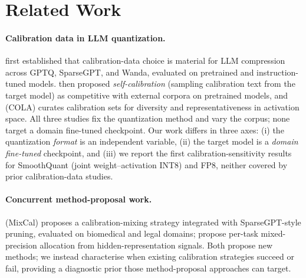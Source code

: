 \documentclass[11pt]{article}
\begin{document}
\section{Related Work}
\label{sec:related}

\paragraph{Calibration data in LLM quantization.}
\begin{sloppypar}
\citet{williams2024calibration} first established that
calibration-data choice is material for LLM compression across
GPTQ, SparseGPT, and Wanda, evaluated on pretrained and
instruction-tuned models.
\citet{williams2025selfcalib} then proposed \emph{self-calibration}
(sampling calibration text from the target model) as competitive
with external corpora on pretrained models, and
\citet{he2025cola} (COLA) curates calibration sets for diversity
and representativeness in activation space.  All three studies
fix the quantization method and vary the corpus; none target a
domain fine-tuned checkpoint.  Our
work differs in three axes: (i) the quantization \emph{format} is
an independent variable, (ii) the target model is a \emph{domain
fine-tuned} checkpoint, and (iii) we report the first
calibration-sensitivity results for SmoothQuant (joint
weight--activation INT8) and FP8, neither covered by prior
calibration-data studies.
\end{sloppypar}

\paragraph{Concurrent method-proposal work.}
\citet{mixcal2026} (MixCal) proposes a calibration-mixing strategy
integrated with SparseGPT-style pruning, evaluated on biomedical and
legal domains; \citet{levi2026pertask} propose per-task mixed-precision
allocation from hidden-representation signals.  Both propose new
methods; we instead characterise when existing calibration strategies
succeed or fail, providing a diagnostic prior those method-proposal
approaches can target.
\end{document}
